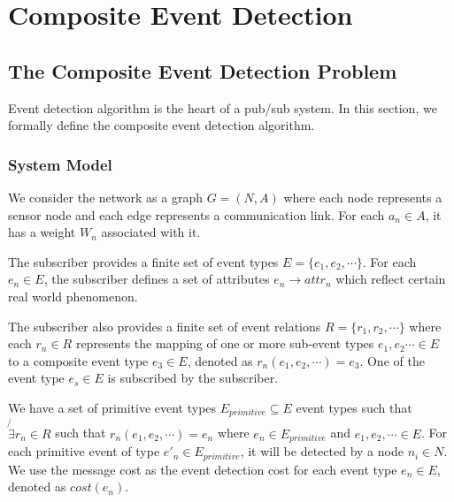 \chapter{Composite Event Detection}
\label{chapter:ted}
\section{The Composite Event Detection Problem}
\label{sec:system_model}
Event detection algorithm is the heart of a pub/sub system. In this section, we formally define the composite event detection algorithm.

\subsection{System Model}
We consider the network as a graph \(G=(N, A)\) where each node represents a sensor node and each edge represents a communication link. For each \(a_n\in A\), it has a weight \(W_n\) associated with it.

The subscriber provides a finite set of event types \(E=\{e_1,e_2,\cdots\}\). For each \(e_n\in E\), the subscriber defines a set of attributes \(e_n\rightarrow attr_n\) which reflect certain real world phenomenon. 

The subscriber also provides a finite set of event relations \(R=\{r_1,r_2, \cdots\}\) where each \(r_n\in R\) represents the mapping of one or more sub-event types \(e_1, e_2\cdots \in E\) to a composite event type \(e_3\in E\), denoted as \(r_n(e_1, e_2, \cdots)=e_3\). One of the event type \(e_s\in E\) is subscribed by the subscriber. %

\begin{comment}
\begin{figure}
\centering
\figurecurrentwidth{eventdag}
\caption{Event DAG}
\label{fig:eventdag}
\end{figure}
\end{comment}

We have a set of primitive event types \(E_{primitive}\subseteq E\) event types such that \(\not{\exists} r_n\in R\) such that \(r_n(e_1, e_2, \cdots)=e_n\) where \(e_n\in E_{primitive}\) and \(e_1, e_2, \cdots \in E\). For each primitive event of type \(e'_n\in E_{primitive}\), it will be detected by a node \(n_i\in N\). We use the message cost as the event detection cost for each event type \(e_n\in E\), denoted as \(cost(e_n)\).

